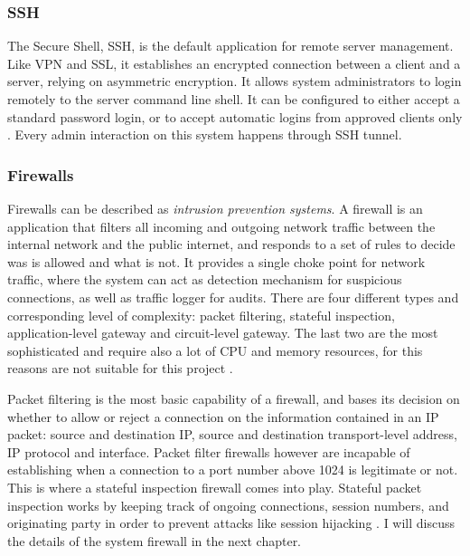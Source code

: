 \subsubsection{SSH}
The Secure Shell, SSH, is the default application for remote server management.
Like VPN and SSL, it establishes an encrypted connection between a client and a
server, relying on asymmetric encryption. It allows system administrators to
login remotely to the server command line shell. It can be configured to either
accept a standard password login, or to accept automatic logins from approved
clients only \cite{WS15}. Every admin interaction on this system happens through
SSH tunnel.

\subsubsection{Firewalls}
Firewalls can be described as \emph{intrusion prevention systems}. A firewall is
an application that filters all incoming and outgoing network traffic between
the internal network and the public internet, and responds to a set of rules to
decide was is allowed and what is not. It provides a single choke point
for network traffic, where the system can act as detection mechanism for
suspicious connections, as well as traffic logger for audits. There are four
different types and corresponding level of complexity: packet filtering,
stateful inspection, application-level gateway and circuit-level gateway. The
last two are the most sophisticated and require also a lot of CPU and memory
resources, for this reasons are not suitable for this project \cite{WC03}.

Packet filtering is the most basic capability of a firewall, and bases its
decision on whether to allow or reject a connection on the information contained in an IP
packet: source and destination IP, source and destination transport-level
address, IP protocol and interface. Packet filter firewalls however are
incapable of establishing when a connection to a port number above 1024 is
legitimate or not. This is where a stateful inspection firewall comes into play.
Stateful packet inspection works by keeping track of ongoing connections,
session numbers, and originating party in order to prevent attacks like session
hijacking \cite{WS15}. I will discuss the details of the system firewall in the
next chapter.

